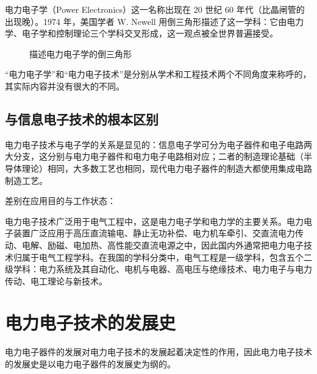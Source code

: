 电力电子学（Power Electronics）这一名称出现在 20 世纪 60 年代（比晶闸管的出现晚）。1974 年，美国学者 W. Newell 用倒三角形描述了这一学科：它由电力学、电子学和控制理论三个学科交叉形成，这一观点被全世界普遍接受。

\begin{figure}[htbp]
\centering
{}
\caption{描述电力电子学的倒三角形}
\label{fig:1-1}
\end{figure}

“电力电子学”和“电力电子技术”是分别从学术和工程技术两个不同角度来称呼的，其实际内容并没有很大的不同。

\subsection{与信息电子技术的根本区别}

电力电子技术与电子学的关系是显见的：信息电子学可分为电子器件和电子电路两大分支，这分别与电力电子器件和电力电子电路相对应；二者的制造理论基础（半导体理论）相同，大多数工艺也相同，现代电力电子器件的制造大都使用集成电路制造工艺。

差别在应用目的与工作状态：


电力电子技术广泛用于电气工程中，这是电力电子学和电力学的主要关系。电力电子装置广泛应用于高压直流输电、静止无功补偿、电力机车牵引、交直流电力传动、电解、励磁、电加热、高性能交直流电源之中，因此国内外通常把电力电子技术归属于电气工程学科。在我国的学科分类中，电气工程是一级学科，包含五个二级学科：电力系统及其自动化、电机与电器、高电压与绝缘技术、电力电子与电力传动、电工理论与新技术。

\section{电力电子技术的发展史}

电力电子器件的发展对电力电子技术的发展起着决定性的作用，因此电力电子技术的发展史是以电力电子器件的发展史为纲的。

